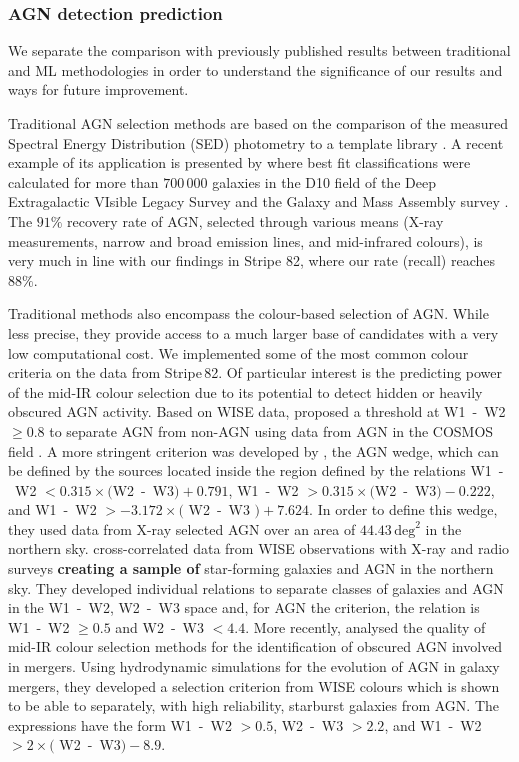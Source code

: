 \documentclass{aa}
\begin{document}
\subsubsection{AGN detection prediction}\label{sec:previous_AGN_detection}

We separate the comparison with previously published results between traditional and ML methodologies in order to understand the significance of our results and ways for future improvement.

Traditional AGN selection methods are based on the comparison of the measured Spectral Energy Distribution (SED) photometry to a template library \citep{2011Ap&SS.331....1W}. A recent example of its application is presented by  \citet{2022MNRAS.509.4940T} where best fit classifications were calculated for more than $700\,000$ galaxies in the D10 field of the Deep Extragalactic VIsible Legacy Survey \citep[DEVILS;][]{2018MNRAS.480..768D} and the Galaxy and Mass Assembly survey \citep[GAMA;][]{2011MNRAS.413..971D, 2015MNRAS.452.2087L}.
The $91 \%$ recovery rate of AGN, selected through various means (X-ray measurements, narrow and broad emission lines, and mid-infrared colours), is very much in line with our findings in Stripe 82, where our rate (recall) reaches $88 \%$.

Traditional methods also encompass the colour-based selection of AGN. While less precise, they provide access to a much larger base of candidates with a very low computational cost. We implemented some of the most common colour criteria on the data from Stripe\,82.
Of particular interest is the predicting power of the mid-IR colour selection due to its potential to detect hidden or heavily obscured AGN activity. 
 Based on WISE \citep{2010AJ....140.1868W} data, \citet[][S12]{2012ApJ...753...30S} proposed a threshold at W1~-~W2 $\geq 0.8$ to separate AGN from non-AGN using data from AGN in the COSMOS field \citep{2007ApJS..172....1S}.
A more stringent criterion was developed by \citet[][M12]{2012MNRAS.426.3271M}, the AGN wedge, which can be defined by the sources located inside the region defined by the relations W1~-~W2 $< 0.315 \times($W2~-~W3$)+ 0.791$, W1~-~W2 $> 0.315 \times($W2~-~W3$)- 0.222$, and W1~-~W2 $> -3.172 \times($ W2~-~W3 $)+ 7.624$. In order to define this wedge, they used data from X-ray selected AGN over an area of $44.43\, \mathrm{deg}^{2}$ in the northern sky.
\citet[][M16]{2016MNRAS.462.2631M} cross-correlated data from WISE observations with X-ray and radio surveys \textbf{creating a sample of} star-forming galaxies and AGN in the northern sky. They developed individual relations to separate classes of galaxies and AGN in the W1~-~W2, W2~-~W3 space and, for AGN the criterion, the relation is  W1~-~W2 $\geq 0.5$ and W2~-~W3 $< 4.4$.
More recently, \citet[][B18]{2018MNRAS.478.3056B} analysed the quality of mid-IR colour selection methods for the identification of obscured AGN involved in mergers. Using hydrodynamic simulations for the evolution of AGN in galaxy mergers, they developed a selection criterion from WISE colours which is shown to be able to separately, with high reliability, starburst galaxies from AGN. The expressions have the form W1~-~W2 $> 0.5$, W2~-~W3 $> 2.2$, and W1~-~W2 $> 2 \times($ W2~-~W3$) -8.9$.
\end{document}
